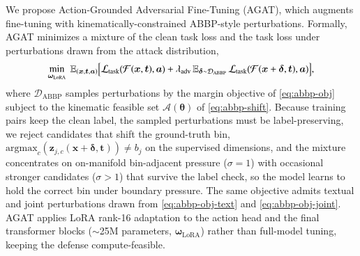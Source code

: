 \documentclass[11pt,letterpaper]{article}
\begin{document}
 We propose Action-Grounded Adversarial Fine-Tuning (AGAT), which augments fine-tuning with kinematically-constrained ABBP-style perturbations. Formally, AGAT minimizes a mixture of the clean task loss and the task loss under perturbations drawn from the attack distribution,
\vspace{-1.5ex}\begin{equation}
  \small
\min_{\bm{\omega}_{\mathrm{LoRA}}}\;\mathbb{E}_{(\bm{x},\bm{t},\bm{a})}\Bigl[\mathcal{L}_{\mathrm{task}}\bigl(\mathcal{F}(\bm{x},\bm{t}),\bm{a}\bigr)+\lambda_{\mathrm{adv}}\,\mathbb{E}_{\bm{\delta}\sim\mathcal{D}_{\mathrm{ABBP}}}\,\mathcal{L}_{\mathrm{task}}\bigl(\mathcal{F}(\bm{x}+\bm{\delta},\bm{t}),\bm{a}\bigr)\Bigr],
\label{eq:agat-obj}
\vspace{-1.5ex}\end{equation}
where $\mathcal{D}_{\mathrm{ABBP}}$ samples perturbations by the margin objective of \autoref{eq:abbp-obj} subject to the kinematic feasible set $\mathcal{A}(\bm{\theta})$ of \autoref{eq:abbp-shift}. Because training pairs keep the clean label, the sampled perturbations must be label-preserving, \ie we reject candidates that shift the ground-truth bin, \ie $\text{argmax}_{c} (\bm{z}_{j,c}(\bm{x}{+}\bm{\delta},\bm{t}))\neq b_j$ on the supervised dimensions, and the mixture concentrates on on-manifold bin-adjacent pressure ($\sigma{=}1$) with occasional stronger candidates ($\sigma{>}1$) that survive the label check, so the model learns to hold the correct bin under boundary pressure. The same objective admits textual and joint perturbations drawn from \autoref{eq:abbp-obj-text} and \autoref{eq:abbp-obj-joint}. 
AGAT applies LoRA rank-16 adaptation to the action head and the final transformer blocks ($\sim$25M parameters, $\bm{\omega}_{\mathrm{LoRA}}$) rather than full-model tuning, keeping the defense compute-feasible.

\end{document}
